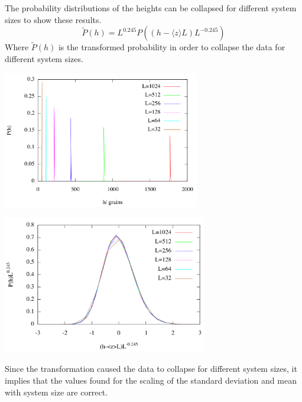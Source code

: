 \documentclass[twoside]{article}
\begin{document}
The probability distributions of the heights can be collapsed for different system sizes to show these results.
\[
\widetilde{P}(h)=L^{0.245} P(( h-\langle z \rangle L) L^{-0.245})
\]
Where $\widetilde{P}(h)$ is the transformed probability in order to collapse the data for different system sizes.
\begin{multicols}{2}
\begin{center}
  \includegraphics[height=60mm]{pvh.png}
\end{center}
\begin{center}
  \includegraphics[height=60mm]{pvhb.png}
\end{center}
\end{multicols}
Since the transformation caused the data to collapse for different system sizes, it implies that the values found for the scaling of the standard deviation and mean with system size are correct.
\end{document}
